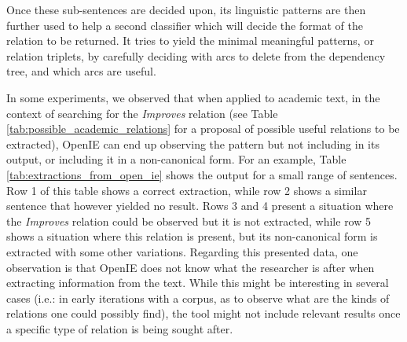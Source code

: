 \documentclass[11pt,a4paper,openright]{memoir}
\begin{document}
Once these sub-sentences are decided upon, its linguistic patterns are then further used to help a second classifier which will decide the format of the relation to be returned. It tries to yield the minimal meaningful patterns, or relation triplets, by carefully deciding with arcs to delete from the dependency tree, and which arcs are useful.

In some experiments, we observed that when applied to academic text, in the context of searching for the \emph{Improves} relation (see Table \ref{tab:possible_academic_relations} for a proposal of possible useful relations to be extracted), OpenIE can end up observing the pattern but not including in its output, or including it in a non-canonical form. For an example, Table \ref{tab:extractions_from_open_ie} shows the output for a small range of sentences. Row 1 of this table shows a correct extraction, while row 2 shows a similar sentence that however yielded no result. Rows 3 and 4 present a situation where the \emph{Improves} relation could be observed but it is not extracted, while row 5 shows a situation where this relation is present, but its non-canonical form is extracted with some other variations. Regarding this presented data, one observation is that OpenIE does not know what the researcher is after when extracting information from the text. While this might be interesting in several cases (i.e.: in early iterations with a corpus, as to observe what are the kinds of relations one could possibly find), the tool might not include relevant results once a specific type of relation is being sought after.
\end{document}
